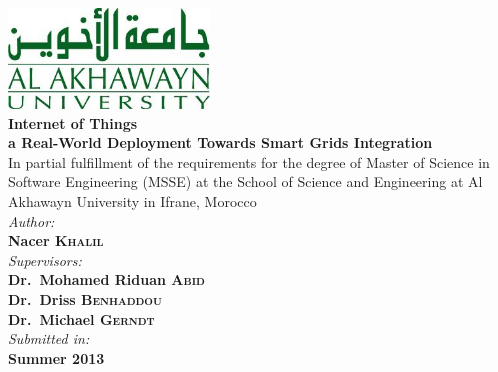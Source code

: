 \begin{titlepage}
\begin{center}
\includegraphics[width=0.4\textwidth]{img/aui_logo.jpg}
\\
{ \huge \bfseries Internet of Things
\\ a Real-World Deployment Towards Smart Grids Integration}\\[1.0cm]

In partial fulfillment of the requirements for the degree of Master of Science in Software Engineering (MSSE) at the School of Science and Engineering at Al Akhawayn University in Ifrane, Morocco \\[1.0cm]


\emph{Author:}\\
{\large \textbf{Nacer \textsc{Khalil}}}\\[1.0cm]

\emph{Supervisors:} \\
{\large \textbf{Dr.~Mohamed Riduan \textsc{Abid}}} \\
{\large \textbf{Dr.~Driss \textsc{Benhaddou}}} \\
{\large \textbf{Dr.~Michael \textsc{Gerndt}}} \\[1.0cm]

\vfill
\emph{Submitted in:}\\
{\large \textbf{Summer 2013}} \\
\end{center}
\end{titlepage}
